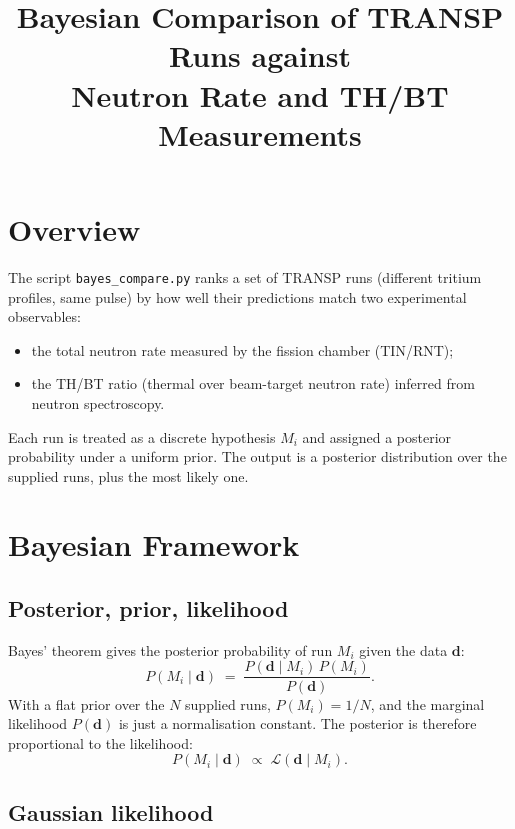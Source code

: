 \documentclass[11pt,a4paper]{article}
\title{Bayesian Comparison of TRANSP Runs against \\ Neutron Rate and TH/BT Measurements}
\author{}
\date{}
\begin{document}
\maketitle

\section{Overview}

The script \texttt{bayes\_compare.py} ranks a set of TRANSP runs (different
tritium profiles, same pulse) by how well their predictions match two
experimental observables:

\begin{itemize}
    \item the total neutron rate measured by the fission chamber
          (\textsc{TIN/RNT});
    \item the TH/BT ratio (thermal over beam-target neutron rate) inferred
          from neutron spectroscopy.
\end{itemize}

Each run is treated as a discrete hypothesis $M_i$ and assigned a posterior
probability under a uniform prior. The output is a posterior distribution
over the supplied runs, plus the most likely one.

\section{Bayesian Framework}

\subsection{Posterior, prior, likelihood}

Bayes' theorem gives the posterior probability of run $M_i$ given the data
$\mathbf{d}$:
\begin{equation}
    P(M_i \mid \mathbf{d}) \;=\;
    \frac{P(\mathbf{d} \mid M_i)\, P(M_i)}{P(\mathbf{d})}.
\end{equation}
With a flat prior over the $N$ supplied runs,
$P(M_i) = 1/N$, and the marginal likelihood $P(\mathbf{d})$ is just a
normalisation constant. The posterior is therefore proportional to the
likelihood:
\begin{equation}
    P(M_i \mid \mathbf{d}) \;\propto\; \mathcal{L}(\mathbf{d} \mid M_i).
\end{equation}

\subsection{Gaussian likelihood}
\end{document}

